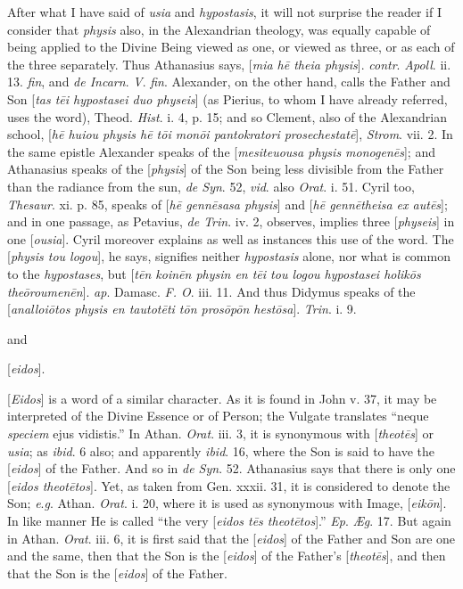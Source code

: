 After what I have said of \emph{usia}
and \emph{hypostasis}, it will not surprise the reader if I
consider that \emph{physis} also, in the Alexandrian theology,
was equally capable of being applied to the Divine Being
viewed as one, or viewed as three, or as each of the three
separately. Thus Athanasius says, [\emph{mia h\={e} theia
physis}]. \emph{contr}. \emph{Apoll}. ii. 13. \emph{fin}, and \emph{de
Incarn}. \emph{V}. \emph{fin}. Alexander, on the other
hand, calls the Father and Son [\emph{tas t\={e}i hypostasei
duo physeis}] (as Pierius, to whom I have already referred,
uses the word), Theod. \emph{Hist}. i. 4, p. 15; and so
Clement, also of the Alexandrian school, [\emph{h\={e} huiou
physis h\={e} t\={o}i mon\={o}i pantokratori
prosechestat\={e}}], \emph{Strom}. vii. 2. In the same
epistle Alexander speaks of the [\emph{mesiteuousa physis monogen\={e}s}];
and Athanasius speaks of the [\emph{physis}] of the Son being
less divisible from the Father than the radiance from the sun,
\emph{de Syn}. 52, \emph{vid}. also \emph{Orat}. i. 51. Cyril
too, \emph{Thesaur}. xi. p. 85, speaks of [\emph{h\={e} genn\={e}sasa
physis}] and [\emph{h\={e} genn\={e}theisa ex aut\={e}s}];
and in one passage, as Petavius, \emph{de Trin}. iv. 2,
observes, implies three [\emph{physeis}] in one [\emph{ousia}].
Cyril moreover explains as well as instances this use of the
word. The [\emph{physis tou logou}], he says, signifies
neither \emph{hypostasis} alone, nor what is common to the \emph{hypostases},
but [\emph{t\={e}n koin\={e}n physin en t\={e}i tou
logou hypostasei holik\={o}s the\={o}roumen\={e}n}]. \emph{ap}.
Damasc. \emph{F. O}. iii. 11. And thus Didymus speaks of the [\emph{analloi\={o}tos
physis en tautot\={e}ti t\={o}n pros\={o}p\={o}n hest\={o}sa}].
\emph{Trin}. i. 9.

and

[\emph{eidos}].

[\emph{Eidos}] is a word of a similar
character. As it is found in John v. 37, it may be interpreted
of the Divine Essence or of Person; the Vulgate translates ``neque
\emph{speciem} ejus vidistis.'' In Athan. \emph{Orat}. iii. 3,
it is synonymous with [\emph{theot\={e}s}] or \emph{usia};
as \emph{ibid}. 6 also; and apparently \emph{ibid}. 16, where
the Son is said to have the [\emph{eidos}] of the Father. And
so in \emph{de Syn}. 52. Athanasius says that there is only
one [\emph{eidos
theot\={e}tos}]. Yet, as taken from Gen. xxxii. 31, it
is considered to denote the Son; \emph{e}.\emph{g}. Athan. \emph{Orat}.
i. 20, where it is used as synonymous with Image, [\emph{eik\={o}n}].
In like manner He is called ``the very [\emph{eidos t\={e}s
theot\={e}tos}].'' \emph{Ep}. \emph{Æg}. 17. But again
in Athan. \emph{Orat}. iii. 6, it is first said that the [\emph{eidos}]
of the Father and Son are one and the same, then that the Son
is the [\emph{eidos}] of the Father's [\emph{theot\={e}s}],
and then that the Son is the [\emph{eidos}] of the Father.

